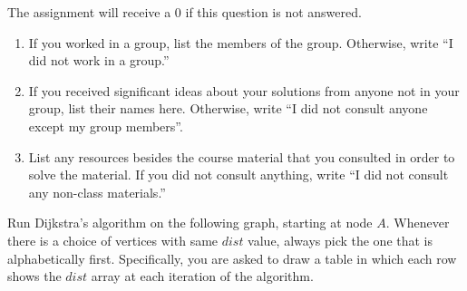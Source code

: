 \documentclass[11pt]{article}
\begin{document}
\begin{qunlist}
\setcounter{sparectr}{-1}

	The assignment will receive a 0 if this question is not answered.
\begin{enumerate}
	\item If you worked in a group, list the members of the group. Otherwise, write ``I did not work in a group.''
	\item If you received significant ideas about your solutions from anyone not in your group, list their names here. Otherwise, write ``I did not consult  anyone except my group members''.
	\item List any resources besides the course material that you consulted in order to solve the material. If you did not consult anything, write ``I did not consult any non-class materials.''
\end{enumerate}
 Run Dijkstra’s algorithm on the following graph, starting at node $A$. 
Whenever there is a choice of vertices with same $dist$ value, always pick the one that is alphabetically first. 
Specifically, you are asked to draw a table in which each row shows the $dist$ array at each iteration of the algorithm.

\end{qunlist}
\end{document}
